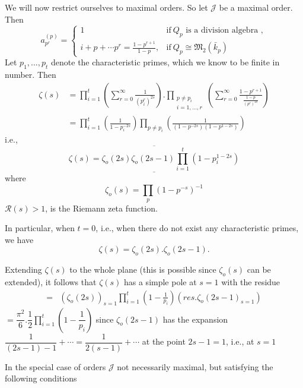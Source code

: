 We will now restrict ourselves to maximal orders. So let $\mathcal{J}$
be a maximal order. Then 
\begin{equation*}
  a^{(p)}_{p^r} = 
  \begin{cases}
    1 &\text{if}~ Q_p \text{ is a division algebra }, \\ 
    i+ p+ \cdots p^r = \frac{1-p^{r+1}}{1-p}, & \text{if}~ Q_p \cong
    \mathfrak{M}_2 (\bar{k}_p)  
  \end{cases}
\end{equation*}
Let $p_1, \ldots,  p_t$ denote the characteristic primes, which we
know to be finite in number. Then 
\begin{align*}
  \zeta(s) &= \prod^t_{i=1} \left( \sum^\infty_{r=0}
  \frac{1}{(p_i^r)^{2s}} \right). \prod_{\substack{p \neq p_i \\ i=1,
      \ldots,  r}} \left( \sum^\infty_{r=0} \frac{1-
    p^{r+1}}{\frac{1-p}{(p^r)^{2s}}}\right) \\ 
  &=\prod^t_{i=1} \left( \frac {1}{1-p_i^{-2s}}\right) \prod_{p \neq
    p_i} \left( \frac{1}{(1-p^{-2s}) (1-p^{1-2s})} \right)  
\end{align*}
i.e.,\pageoriginale 
$$
\overline{\underline{\zeta (s) = \zeta_o (2s) \zeta_o(2s-1)
    \prod^t_{i=1} (1 - p^{1-2s}_{i})}} 
$$
where  
$$
\zeta_o(s) = \prod_p (1 - p^{-s})^{-1}
$$
$\mathscr{R}(s) > 1$, is the Riemann zeta function.

In particular, when $t = 0$, i.e.,  when there do not exist any
characteristic primes, we have 
$$
\zeta(s) = \zeta_o(2s). \zeta_o(2s-1). 
$$

Extending $\zeta(s)$ to the whole plane (this is possible since
$\zeta_o(s)$ can be extended), it follows that $\zeta(s)$ has a simple
pole at $s=1$ with the residue 
\begin{align*} 
  = & (\zeta_o (2 s))_{s=1} \prod^t_{i=1} \left(1 -\frac{1}{p_i}\right)
  (res. \zeta_o (2s - 1)_{s=1})
\end{align*}
  $=  \dfrac{\pi^2}{6}. \dfrac{1}{2} \prod^t_{i=1} \left(1
-\dfrac{1}{p_i}\right)$ since  $\zeta_o (2s - 1)$ has the expansion  
$\dfrac{1}{(2 s-1)-1} + \cdots = \dfrac{1}{2( s-1)} + \cdots$ at the
point $2s-1 = 1$, i.e., at $s= 1$ 

\begin{note}
  In the special case of orders $\mathcal{J}$ not necessarily maximal,
  but satisfying the following conditions 
\end{note}

